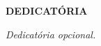 \begin{dedicatoria}
   \begin{center}
    \ABNTEXchapterfont\Large\bfseries DEDICATÓRIA
   \end{center}
   \vspace*{\fill}
   \raggedleft 
   \noindent
   \textit{Dedicatória opcional.}  
   \vspace{4cm} 
\end{dedicatoria}
